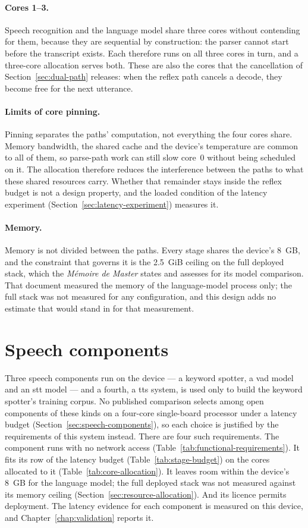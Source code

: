 \paragraph{Cores 1--3.} Speech recognition and the language model share three cores without
contending for them, because they are sequential by construction: the parser cannot start before
the transcript exists. Each therefore runs on all three cores in turn, and a three-core allocation
serves both. These are also the cores that the cancellation of Section~\ref{sec:dual-path}
releases: when the reflex path cancels a decode, they become free for the next utterance.

\paragraph{Limits of core pinning.} Pinning separates the paths' computation, not everything
the four cores share. Memory bandwidth, the shared cache and the device's temperature are common to
all of them, so parse-path work can still slow core~0 without being scheduled on it. The
allocation therefore reduces the interference between the paths to what these shared resources
carry. Whether that remainder stays inside the reflex budget is not a design property, and the
loaded condition of the latency experiment (Section~\ref{sec:latency-experiment}) measures it.

\paragraph{Memory.} Memory is not divided between the paths. Every stage shares the device's
8~GB, and the constraint that governs it is the 2.5~GiB ceiling on the full deployed stack, which
the \emph{M\'emoire de Master} states and assesses for its model comparison. That document measured
the memory of the language-model process only; the full stack was not measured for any
configuration, and this design adds no estimate that would stand in for that measurement.

\section{Speech components}
\label{sec:component-choices}
Three speech components run on the device --- a keyword spotter, a \gls{vad} model and an
\gls{stt} model --- and a fourth, a \gls{tts} system, is used only to build the keyword spotter's
training corpus. No published comparison selects among open components of these kinds on a
four-core single-board processor under a latency budget (Section~\ref{sec:speech-components}), so
each choice is justified by the requirements of this system instead. There are four such
requirements. The component runs with no network access (Table~\ref{tab:functional-requirements}).
It fits its row of the latency budget (Table~\ref{tab:stage-budget}) on the cores allocated to it
(Table~\ref{tab:core-allocation}). It leaves room within the device's 8~GB for the language model;
the full deployed stack was not measured against its memory ceiling
(Section~\ref{sec:resource-allocation}). And its licence permits deployment. The latency evidence
for each component is measured on this device, and Chapter~\ref{chap:validation} reports it.

